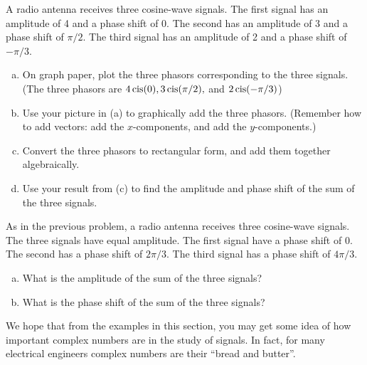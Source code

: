 \begin{exercise}{46}
A radio antenna receives three cosine-wave signals. The first signal has an amplitude of 4 and a phase shift of 0. The second has an amplitude of 3 and a phase shift of $\pi/2$. The third signal has an amplitude of 2 and a phase shift of $-\pi/3$.
\begin{enumerate}[(a)]
\item
On graph paper,  plot the three phasors corresponding to the three signals. (The three phasors are $4 \operatorname{cis}(0), 3 \operatorname{cis}(\pi/2),$ and $2 \operatorname{cis}(-\pi/3)$)
\item
Use your picture in (a) to graphically add the three phasors. (Remember how to add vectors:  add the $x$-components, and add the $y$-components.)
\item
Convert the three phasors to rectangular form, and add them together algebraically.
\item
Use your result from (c) to find the amplitude and phase shift of the sum of the three signals.
\end{enumerate}
\end{exercise}


\begin{exercise}{47}
As in the previous problem, a radio antenna receives three cosine-wave signals. The three signals have equal amplitude. The first signal have a phase shift of 0. The second has a phase shift of $2\pi/3$. The third signal has  a phase shift of $4\pi/3$.
\begin{enumerate}[(a)]
\item
 What is the amplitude of the sum of the three signals?
\item
What is the phase shift of the sum of the three signals?
\end{enumerate}
\end{exercise}

We hope that from the examples in this section, you may get some idea of how important complex numbers are in the study of signals. In fact, for many electrical engineers complex numbers are their ``bread and butter''. 


